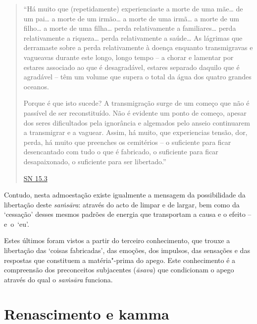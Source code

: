 \begin{quote}

  ``Há muito que (repetidamente) experienciaste a morte de uma mãe\ldots{} de um
  pai\ldots{} a morte de um irmão\ldots{} a morte de uma irmã\ldots{} a morte de
  um filho\ldots{} a morte de uma filha\ldots{} perda relativamente a
  familiares\ldots{} perda relativamente a riqueza\ldots{} perda relativamente a
  saúde\ldots{} As lágrimas que derramaste sobre a perda relativamente à doença
  enquanto transmigravas e vagueavas durante este longo, longo tempo -- a chorar
  e lamentar por estares associado ao que é desagradável, estares separado
  daquilo que é agradável -- têm um volume que supera o total da água dos quatro
  grandes oceanos.

  Porque é que isto sucede? A transmigração surge de um começo que não é
  passível de ser reconstituído. Não é evidente um ponto de começo, apesar dos
  seres dificultados pela ignorância e algemados pelo anseio continuarem a
  transmigrar e a vaguear. Assim, há muito, que experiencias tensão, dor, perda,
  há muito que preenches os cemitérios -- o suficiente para ficar desencantado
  com tudo o que é fabricado, o suficiente para ficar desapaixonado, o
  suficiente para ser libertado.''

  \href{https://suttacentral.net/sn15.3/en/thanissaro}{SN 15.3}

\end{quote}

Contudo, nesta admoestação existe igualmente a mensagem da possibilidade da
libertação deste \emph{saṁsāra}: através do acto de limpar e de largar, bem como
da `cessação' desses mesmos padrões de energia que transportam a causa e o
efeito -- e~o~`eu'.

Estes últimos foram vistos a partir do terceiro conhecimento, que trouxe a
libertação das `coisas fabricadas', das emoções, dos impulsos, das sensações e
das respostas que constituem a matéria"-prima do apego. Este conhecimento é a
compreensão dos preconceitos subjacentes (\emph{āsava}) que condicionam o apego
através do qual o \emph{saṁsāra} funciona.

\section{Renascimento e kamma}

